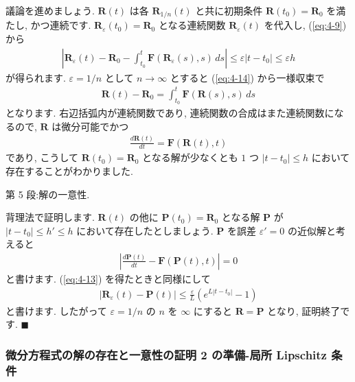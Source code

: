 \documentclass[openany, a4paper, oneside]{book}
\theoremstyle{break}
\theoremstyle{breakdefn}
\newcommand{\abs}[1]{\left|#1\right|}
\newcommand{\bs}{\blacksquare}
\newcommand{\vep}{\varepsilon}
\begin{document}
議論を進めましょう.
$\bm{R}(t)$ は各 $\bm{R}_{1/n}(t)$ と共に初期条件 $\bm{R}(t_0)=\bm{R}_0$ を満たし, かつ連続です.
$\bm{R}_{\vep}(t_0)=\bm{R}_0$ となる連続関数 $\bm{R}_{\vep}(t)$ を代入し, (\ref{eq:4-9}) から
\begin{gather}
\left| \bm{R}_{\vep}(t) - \bm{R}_0 - \int_{t_0}^t \bm{F} (\bm{R}_{\vep} (s) , s ) \, ds \right|
\leq
\vep | t - t_0 |
\leq
\vep h
\end{gather}
が得られます.
$\vep = 1/n$ として $n\to \infty$ とすると (\ref{eq:4-14}) から一様収束で
\begin{gather}
\bm{R}(t) - \bm{R}_0
=
\int_{t_0}^t \bm{F} ( \bm{R}(s) , s ) \, ds
\end{gather}
となります.
右辺括弧内が連続関数であり, 連続関数の合成はまた連続関数になるので,
$\bm{R}$ は微分可能でかつ
\begin{gather}
\frac{d \bm{R} (t)} {dt}
=
\bm{F} ( \bm{R}(t) , t )
\end{gather}
であり, こうして $\bm{R}(t_0) = \bm{R}_0$ となる解が少なくとも $1$ つ $| t - t_0 |\leq h$ において
存在することがわかりました.

第 5 段:解の一意性.

背理法で証明します.
$\bm{R}(t)$ の他に $\bm{P}(t_0) = \bm{R}_0$ となる解 $\bm{P}$ が
$|t-t_0| \leq h' \leq h$ において存在したとしましょう.
$\bm{P}$ を誤差 $\vep '=0$ の近似解と考えると
\begin{gather}
\left| \frac{d \bm{P} (t)} {dt} - \bm{F} ( \bm{P}(t) , t ) \right|
=
0
\end{gather}
と書けます.
(\ref{eq:4-13}) を得たときと同様にして
\begin{gather}
\abs{\bm{R}_{\vep} (t) - \bm{P}(t)}
\leq
\frac{\vep} {L} \left ( e^{L | t - t_0 |} - 1 \right)
\end{gather}
と書けます.
したがって $\vep = 1/n$ の $n$ を $\infty$ にすると $\bm{R}=\bm{P}$
となり, 証明終了です.  $\bs$
\subsubsection{微分方程式の解の存在と一意性の証明 2 の準備-局所 Lipschitz 条件}
\label{sec-5-2-12-2-3}
\end{document}
